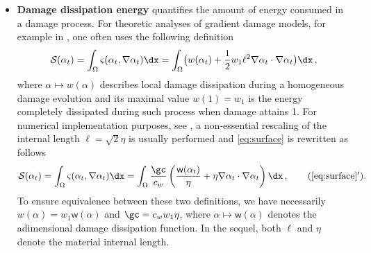\begin{itemize}
\item \textbf{Damage dissipation energy} quantifies the amount of energy consumed in a damage process. For theoretic analyses of gradient damage models, for example in \cite{PhamAmorMarigoMaurini:2011,SicsicMarigo:2013}, one often uses the following definition
\begin{equation} \label{eq:surface}
\mathcal{S}(\alpha_t)=\int_\Omega\varsigma(\alpha_t,\nabla\alpha_t)\dx=\int_\Omega\bigl(w(\alpha_t)+\frac{1}{2}w_1\ell^2\nabla\alpha_t\cdot\nabla\alpha_t\bigr)\dx\,,
\end{equation}
where $\alpha\mapsto w(\alpha)$ describes local damage dissipation during a homogeneous damage evolution and its maximal value $w(1)=w_1$ is the energy completely dissipated during such process when damage attains 1. For numerical implementation purposes, see \cite{BourdinMarigoMauriniSicsic:2014,MesgarnejadBourdinKhonsari:2014}, a non-essential rescaling of the internal length $\ell=\sqrt{2}\eta$ is usually performed and \eqref{eq:surface} is rewritten as follows
\begin{align} \label{eq:surfaceGc}
\mathcal{S}(\alpha_t)=\int_\Omega\varsigma(\alpha_t,\nabla\alpha_t)\dx=\int_\Omega\frac{\gc}{c_w}\left(\frac{\mathsf{w}(\alpha_t)}{\eta}+\eta\nabla\alpha_t\cdot\nabla\alpha_t\right)\dx\,,\tag{\ref*{eq:surface}${}^\prime$}.
\end{align}
To ensure equivalence between these two definitions, we have necessarily $w(\alpha)=w_1\mathsf{w}(\alpha)$ and $\gc=c_ww_1\eta$, where $\alpha\mapsto\mathsf{w}(\alpha)$ denotes the adimensional damage dissipation function. In the sequel, both $\ell$ and $\eta$ denote the material internal length. 
\end{itemize}

